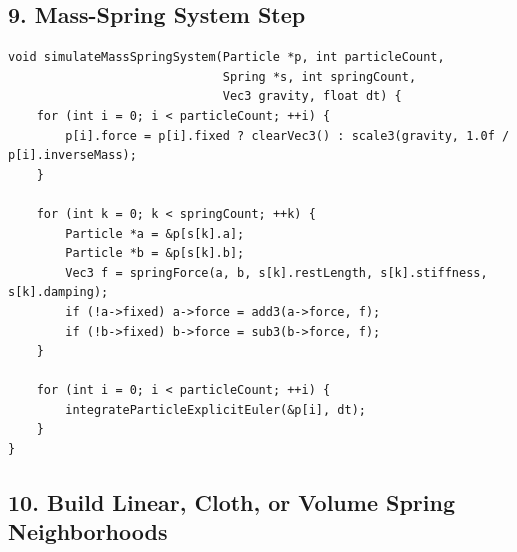 \documentclass[10pt,letterpaper]{article}
\begin{document}
\subsection*{9. Mass-Spring System Step}

\begin{verbatim}
void simulateMassSpringSystem(Particle *p, int particleCount,
                              Spring *s, int springCount,
                              Vec3 gravity, float dt) {
    for (int i = 0; i < particleCount; ++i) {
        p[i].force = p[i].fixed ? clearVec3() : scale3(gravity, 1.0f / p[i].inverseMass);
    }

    for (int k = 0; k < springCount; ++k) {
        Particle *a = &p[s[k].a];
        Particle *b = &p[s[k].b];
        Vec3 f = springForce(a, b, s[k].restLength, s[k].stiffness, s[k].damping);
        if (!a->fixed) a->force = add3(a->force, f);
        if (!b->fixed) b->force = sub3(b->force, f);
    }

    for (int i = 0; i < particleCount; ++i) {
        integrateParticleExplicitEuler(&p[i], dt);
    }
}
\end{verbatim}

\subsection*{10. Build Linear, Cloth, or Volume Spring Neighborhoods}
\end{document}
